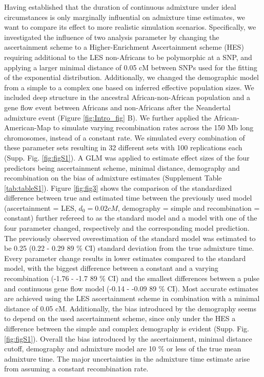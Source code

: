 \documentclass[]{article}
\begin{document}
Having established that the duration of continuous admixture under ideal
circumstances is only marginally influential on admixture time
estimates, we want to compare its effect to more realistic simulation scenarios. Specifically,
we investigated the influence of two analysis parameter by changing the
ascertainment scheme to a Higher-Enrichment Ascertainment scheme (HES) requiring additional
to the LES non-Africans to be polymorphic at a SNP, and applying a
larger minimal distance of 0.05 cM between SNPs used for the fitting of
the exponential distribution. Additionally, we changed the demographic
model from a simple to a complex one based on inferred effective
population sizes. We included deep structure in the
ancestral African-non-African population and a gene flow event between
Africans and non-Africans after the Neandertal admixture event (Figure
\ref{fig:Intro_fig} B). We further applied the African-American-Map to
simulate varying recombination rates across the 150 Mb long chromosomes,
instead of a constant rate. We simulated every combination of these
parameter sets resulting in 32 different sets with 100 replications each
(Supp. Fig. \ref{fig:figS1}). A GLM was applied to
estimate effect sizes of the four predictors being ascertainment scheme,
minimal distance, demography and recombination on the bias of admixture
estimates (Supplement Table \ref{tab:tableS1}). Figure \ref{fig:fig3}
shows the comparison of the standardized difference between true and estimated time between the
previously used model (ascertainment = LES, \(d_{0} = 0.02 cM\),
demography = simple and recombination = constant) further refereed to as
the standard model and a model with one of the four parameter changed,
respectively and the corresponding model prediction. The previously
observed overestimation of the standard model was estimated to be 0.25
(0.22 - 0.29 89 \% CI) standard deviation from the true admixture time.
Every parameter change results in lower estimates compared to the
standard model, with the biggest difference between a constant and a
varying recombination (-1.76 - -1.7 89 \% CI) and the smallest
differences between a pulse and continuous gene flow model (-0.14 -
-0.09 89 \% CI). Most accurate estimates are achieved using the LES
ascertainment scheme in combination with a minimal distance of 0.05 cM. Additionally, the bias introduced by the demography seems to depend on the used
ascertainment scheme, since only under the HES a difference between the
simple and complex demography is evident (Supp. Fig. \ref{fig:figS1}). 
Overall the bias introduced by the ascertainment, minimal distance cutoff,
demography and admixture model are 10 \% or less of the true mean
admixture time. The major uncertainties in the admixture time estimate arise from assuming a constant recombination rate.
\end{document}
